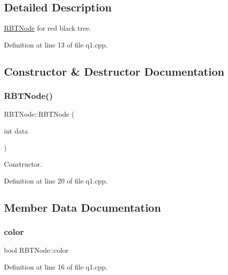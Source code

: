 \subsection{Detailed Description}
\hyperlink{struct_r_b_t_node}{R\+B\+T\+Node} for red black tree. 

Definition at line 13 of file q1.\+cpp.



\subsection{Constructor \& Destructor Documentation}
\mbox{\label{struct_r_b_t_node_a0392480d9b347b937fed779ebfba204b}} 
\subsubsection{\texorpdfstring{R\+B\+T\+Node()}{RBTNode()}}
{\footnotesize\ttfamily R\+B\+T\+Node\+::\+R\+B\+T\+Node (\begin{DoxyParamCaption}\item[{int}]{data }\end{DoxyParamCaption})\hspace{0.3cm}{\ttfamily [inline]}}



Constructor. 



Definition at line 20 of file q1.\+cpp.



\subsection{Member Data Documentation}
\mbox{\label{struct_r_b_t_node_a8e8fa974e4586ceb0883861952fde8e0}} 
\subsubsection{\texorpdfstring{color}{color}}
{\footnotesize\ttfamily bool R\+B\+T\+Node\+::color}



Definition at line 16 of file q1.\+cpp.

